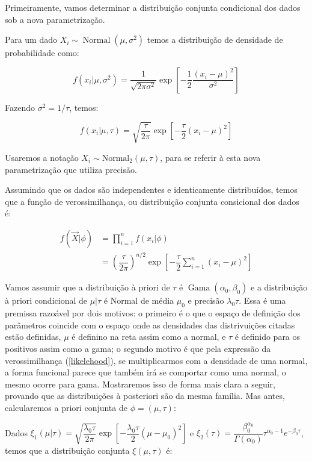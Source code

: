 \documentclass[a4paper]{article}
\newcommand{\op}[1]{{\operatorname{#1}}}
\newcommand{\vX}{\vec X}
\begin{document}
 Primeiramente, vamos determinar a distribuição conjunta condicional dos dados sob a nova parametrização.
 
 Para um dado $X_i \sim \op{Normal}(\mu,\sigma^2)$ temos a distribuição de densidade de probabilidade como:
 
 $$f(x_i|\mu,\sigma^2)=\dfrac{1}{\sqrt{2\pi\sigma^2}}\exp{\left[-\dfrac12\dfrac{(x_i-\mu)^2}{\sigma^2}\right]}$$
 
 Fazendo $\sigma^2=1/\tau$, temos:
 
  $$f(x_i|\mu,\tau)=\sqrt{\dfrac{\tau}{2\pi}}\exp{\left[-\dfrac{\tau}2 (x_i-\mu)^2\right]}$$
  
  Usaremos a notação $X_i\sim \op{Normal_2}(\mu,\tau)$, para se referir à esta nova parametrização que utiliza precisão.
  
  Assumindo que os dados são independentes e identicamente distribuídos, temos que a função de verossimilhança, ou distribuição conjunta consicional dos dados é:
  
  \begin{align}
  f(\vX|\phi) &= \prod_{i=1}^{n}f(x_i|\phi)\nonumber\\
  &=\left(\dfrac{\tau}{2\pi}\right)^{n/2}\exp{\left[-\dfrac{\tau}{2}\sum_{i=1}^{n}(x_i-\mu)^2\right]}\label{likelehood}
  \end{align}
  
  Vamos assumir que a distribuição à priori de $\tau$ é $\op {Gama}(\alpha_0,\beta_0)$ e a distribuição à priori condicional de $\mu|\tau$ é Normal de média $\mu_0$ e precisão $\lambda_0\tau$. Essa é uma premissa razoável por dois motivos: o primeiro é o que o espaço de definição dos parâmetros coincide com o espaço onde as densidades das distrivuições citadas estão definidas, $\mu$ é definino na reta assim como a normal, e $\tau$ é definido para os positivos assim como a gama; o segundo motivo é que pela expressão da verossimilhança (\ref{likelehood}), se multiplicarmos com a densidade de uma normal, a forma funcional parece que também irá se comportar como uma normal, o mesmo ocorre para gama. Mostraremos isso de forma mais clara a seguir, provando que as distribuições à posteriori são da mesma família. Mas antes, calcularemos a priori conjunta de $\phi=(\mu,\tau)$:
  
  Dados $\xi_1(\mu|\tau)=\sqrt{\dfrac{\lambda_0\tau}{2\pi}}\exp{\left[-\dfrac{\lambda_0\tau}2 (\mu-\mu_0)^2\right]}$ e $\xi_2(\tau)=\dfrac{\beta_0^{\alpha_0}}{\Gamma(\alpha_0)}\tau^{\alpha_0-1}e^{-\beta_0\tau}$, temos que a distribuição conjunta $\xi(\mu,\tau)$ é:
  
\end{document}
